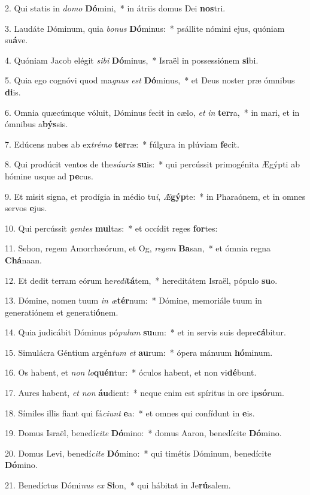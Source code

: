 2. Qui statis in \textit{do}\textit{mo} \textbf{Dó}mini,~*  in átriis domus Dei \textbf{nos}tri.\

3. Laudáte Dóminum, quia \textit{bo}\textit{nus} \textbf{Dó}minus:~*  psállite nómini ejus, quóniam su\textbf{á}ve.\

4. Quóniam Jacob elégit \textit{si}\textit{bi} \textbf{Dó}minus,~*  Israël in possessiónem \textbf{si}bi.\

5. Quia ego cognóvi quod ma\textit{gnus} \textit{est} \textbf{Dó}minus,~*  et Deus noster præ ómnibus \textbf{di}is.\

6. Omnia quæcúmque vóluit, Dóminus fecit in cælo, \textit{et} \textit{in} \textbf{ter}ra,~*  in mari, et in ómnibus a\textbf{býs}sis.\

7. Edúcens nubes ab ex\textit{tré}\textit{mo} \textbf{ter}ræ:~*  fúlgura in plúviam \textbf{fe}cit.\

8. Qui prodúcit ventos de the\textit{sáu}\textit{ris} \textbf{su}is:~*  qui percússit primogénita Ægýpti ab hómine usque ad \textbf{pe}cus.\

9. Et misit signa, et prodígia in médio tu\textit{i}, \textit{Æ}\textbf{gýp}te:~*  in Pharaónem, et in omnes servos \textbf{e}jus.\

10. Qui percússit \textit{gen}\textit{tes} \textbf{mul}tas:~*  et occídit reges \textbf{for}tes:\

11. Sehon, regem Amorrhæórum, et Og, \textit{re}\textit{gem} \textbf{Ba}san,~*  et ómnia regna \textbf{Chá}naan.\

12. Et dedit terram eórum he\textit{re}\textit{di}\textbf{tá}tem,~*  hereditátem Israël, pópulo \textbf{su}o.\

13. Dómine, nomen tuum \textit{in} \textit{æ}\textbf{tér}num:~*  Dómine, memoriále tuum in generatiónem et generati\textbf{ó}nem.\

14. Quia judicábit Dóminus pó\textit{pu}\textit{lum} \textbf{su}um:~*  et in servis suis depre\textbf{cá}bitur.\

15. Simulácra Géntium argén\textit{tum} \textit{et} \textbf{au}rum:~*  ópera mánuum \textbf{hó}minum.\

16. Os habent, et \textit{non} \textit{lo}\textbf{quén}tur:~*  óculos habent, et non vi\textbf{dé}bunt.\

17. Aures habent, \textit{et} \textit{non} \textbf{áu}dient:~*  neque enim est spíritus in ore ip\textbf{só}rum.\

18. Símiles illis fiant qui fá\textit{ci}\textit{unt} \textbf{e}a:~*  et omnes qui confídunt in \textbf{e}is.\

19. Domus Israël, benedí\textit{ci}\textit{te} \textbf{Dó}mino:~*  domus Aaron, benedícite \textbf{Dó}mino.\

20. Domus Levi, benedí\textit{ci}\textit{te} \textbf{Dó}mino:~*  qui timétis Dóminum, benedícite \textbf{Dó}mino.\

21. Benedíctus Dómi\textit{nus} \textit{ex} \textbf{Si}on,~*  qui hábitat in Je\textbf{rú}salem.\

